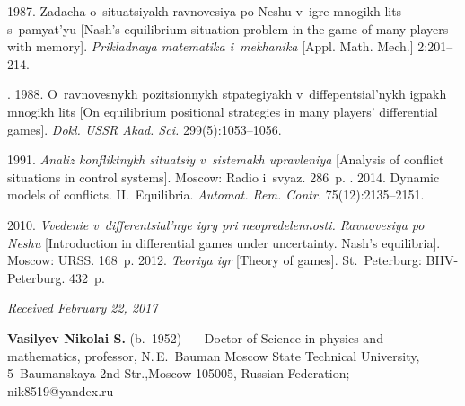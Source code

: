 \begin{multicols}{2}
{{\begin{thebibliography}{99}
 1987. Zadacha o~situatsiyakh ravnovesiya po Neshu v~igre 
mnogikh lits s~pamyat'yu [Nash's equilibrium situation problem in the game of many 
players with memory]. \textit{Prikladnaya matematika i~mekhanika} [Appl. 
Math. Mech.] 2:201--214.

. 1988. O~ravnovesnykh 
pozitsionnykh stpategiyakh v~diffepentsial'nykh igpakh mnogikh lits [On equilibrium 
positional strategies in many players' differential games]. \textit{Dokl. USSR
Akad. Sci.} 299(5):1053--1056.

 1991. \textit{Analiz 
konfliktnykh situatsiy v~sistemakh upravleniya} [Analysis of conflict situations in 
control systems]. Moscow: Radio i~svyaz. 286~p.
. 2014. Dynamic models of conflicts.
II.~Equilibria. 
\textit{Automat. Rem. Contr.} 75(12):2135--2151.

 2010. \textit{Vvedenie v~differentsial'nye igry pri 
neopredelennosti. Ravnovesiya po Neshu} [Introduction in differential games under 
uncertainty. Nash's equilibria]. Moscow: URSS. 168~p.
 2012. \textit{Teoriya igr} [Theory of games]. St.\ Peterburg: 
BHV-Peterburg. 432~p.
\end{thebibliography}

 }
 }

\end{multicols}

\vspace*{-3pt}

\hfill{\small\textit{Received February 22, 2017}}
    
    
    \Contrl
    
    \noindent
\textbf{Vasilyev Nikolai S.} (b.\ 1952)~--- Doctor of Science in physics and mathematics, professor, 
N.\,E.~Bauman Moscow State Technical University, 5~Baumanskaya 2nd  Str.,Moscow 105005, Russian 
Federation; \mbox{nik8519@yandex.ru}
    
\label{end\stat}


\renewcommand{\bibname}{\protect\rm Литература} 